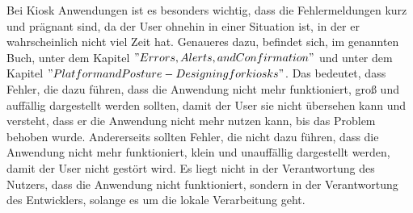 Bei Kiosk Anwendungen ist es besonders wichtig, dass die Fehlermeldungen kurz und prägnant sind, da der User ohnehin in einer Situation ist, in der er wahrscheinlich nicht viel Zeit hat.
Genaueres dazu, befindet sich, im genannten Buch, unter dem Kapitel \("Errors, Alerts, and Confirmation"\) und unter dem Kapitel \("Platform and Posture - Designing for kiosks"\).
Das bedeutet, dass Fehler, die dazu führen, dass die Anwendung nicht mehr funktioniert, groß und auffällig dargestellt werden sollten, damit der User sie nicht übersehen kann und versteht, dass er die Anwendung nicht mehr nutzen kann, bis das Problem behoben wurde.
Andererseits sollten Fehler, die nicht dazu führen, dass die Anwendung nicht mehr funktioniert, klein und unauffällig dargestellt werden, damit der User nicht gestört wird.
Es liegt nicht in der Verantwortung des Nutzers, dass die Anwendung nicht funktioniert, sondern in der Verantwortung des Entwicklers, solange es um die lokale Verarbeitung geht.
\newline

